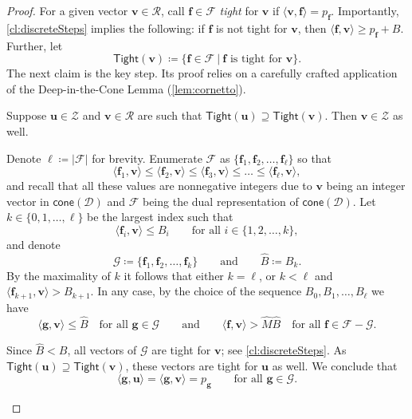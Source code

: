 \documentclass{theoretics}
\renewcommand{\leq}{\leqslant}
\renewcommand{\geq}{\geqslant}
\newcommand{\Dd}{\mathcal{D}}
\newcommand{\tup}[1]{{\mathbf{#1}}}
\newcommand{\ff}{\tup f}
\renewcommand{\gg}{\tup g}
\newcommand{\uu}{\tup u}
\newcommand{\myvv}{\tup v} %
\newcommand{\Ff}{\mathcal{F}}
\newcommand{\Gg}{\mathcal{G}}
\newcommand{\Rr}{\mathcal{R}}
\newcommand{\Zz}{\mathcal{Z}}
\newcommand{\Tight}{\mathsf{Tight}}
\newcommand{\sca}[2]{\langle #1,#2\rangle}
\renewcommand{\setminus}{-}
\newcommand{\realcone}{\mathsf{cone}}
\begin{document}
\begin{proof}
For a given vector $\myvv\in \Rr$, call
$\ff\in \Ff$ {\em{tight}} for $\myvv$ if $\sca{\myvv}{\ff}=p_\ff$. Importantly, \cref{cl:discreteSteps} implies the following: if $\ff$ is not tight for $\myvv$, then $\sca{\ff}{\myvv}\geq p_\ff+B$. Further, let
$$\Tight(\myvv)\coloneqq \{\ff\in \Ff~|~\ff\textrm{ is tight for }\myvv\}.$$
The next claim is the key step. Its proof relies on a carefully crafted application of the Deep-in-the-Cone Lemma (\cref{lem:cornetto}).

\begin{techclaim}\label{cl:tightImplies}
 Suppose $\uu\in \Zz$ and $\myvv\in \Rr$ are such that $\Tight(\uu)\supseteq \Tight(\myvv)$. Then $\myvv\in \Zz$ as well.
\end{techclaim}
\begin{subproof}
 Denote $\ell\coloneqq |\Ff|$ for brevity.
 Enumerate $\Ff$ as $\{\ff_1,\ff_2,\ldots,\ff_{\ell}\}$ so that
 $$\sca{\ff_1}{\myvv} \leq \sca{\ff_2}{\myvv}\leq \sca{\ff_3}{\myvv}\leq \ldots \leq \sca{\ff_{\ell}}{\myvv},$$
 and recall that all these values are nonnegative integers due to $\myvv$ being an integer vector in $\realcone(\Dd)$ and $\Ff$ being the dual representation of $\realcone(\Dd)$. Let $k\in \{0,1,\ldots,\ell\}$ be the largest index such that
 $$\sca{\ff_i}{\myvv}\leq B_i\qquad\textrm{for all }i\in \{1,2,\ldots,k\},$$
 and denote
 $$\Gg\coloneqq \{\ff_1,\ff_2,\ldots,\ff_k\}\qquad\textrm{and}\qquad \widehat{B}\coloneqq B_k.$$
 By the maximality of $k$ it follows that either $k=\ell$, or $k<\ell$ and $\sca{\ff_{k+1}}{\myvv}>B_{k+1}$. In any case, by the choice of the sequence $B_0,B_1,\ldots,B_\ell$ we have
 \begin{equation}\label{eq:wydra}
 \sca{\gg}{\myvv} \leq \widehat{B}\quad\textrm{for all }\gg\in \Gg\qquad\textrm{and}\qquad \sca{\ff}{\myvv}>\widehat{M}\widehat{B}\quad \textrm{for all }\ff\in \Ff\setminus \Gg.\end{equation}

 Since $\widehat{B}<B$, all vectors of $\Gg$ are tight for $\myvv$; see \cref{cl:discreteSteps}. As $\Tight(\uu)\supseteq \Tight(\myvv)$, these vectors are tight for $\uu$ as well. We conclude that
 \begin{equation}\label{eq:kapibara}
 \sca{\gg}{\uu}=\sca{\gg}{\myvv}=p_{\gg}\qquad \textrm{for all }\gg\in \Gg.
 \end{equation}


\end{subproof}
\end{proof}
\end{document}

